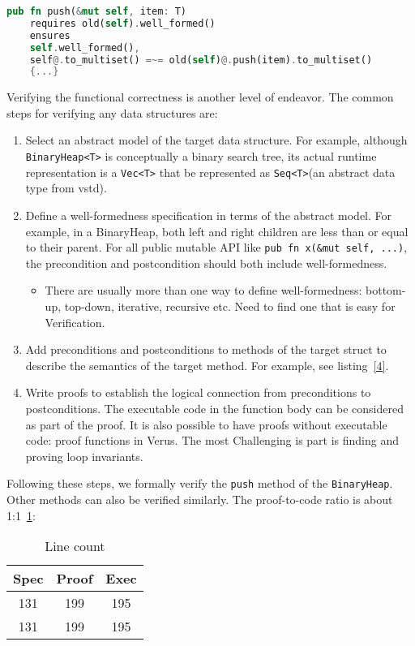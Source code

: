 \documentclass[conference]{IEEEtran}
\begin{document}
\begin{lstlisting}[float,language=Rust,style=colouredRust, caption={The specification of the \texttt{push} method of \texttt{BinaryHeap}.}, label = {4}]
    pub fn push(&mut self, item: T)
    requires old(self).well_formed()
    ensures 
    self.well_formed(),
    self@.to_multiset() =~= old(self)@.push(item).to_multiset()
    {...}
\end{lstlisting}
Verifying the functional correctness is another level of endeavor. The common steps for verifying any data structures are:
\begin{enumerate}
        \item Select an abstract model of the target data structure. For example, although \texttt{BinaryHeap<T>} is conceptually a binary search tree, its actual runtime representation is a \texttt{Vec<T>} that be represented as \texttt{Seq<T>}(an abstract data type from vstd).
   \item Define a well-formedness specification in terms of the abstract model. For example, in a BinaryHeap, both left and right children are less than or equal to their parent. For all public mutable API like \texttt{pub fn x(\&mut self, ...)}, the precondition and postcondition should both include well-formedness. 
   \begin{itemize}
        \item There are usually more than one way to define well-formedness: bottom-up, top-down, iterative, recursive etc. Need to find one that is easy for Verification.
   \end{itemize}
   \item Add preconditions and postconditions to methods of the target struct to describe the semantics of the target method. For example, see listing~\ref{4}.  
   \item Write proofs to establish the logical connection from preconditions to postconditions. The executable code in the function body can be considered as part of the proof. It is also possible to have proofs without executable code: proof functions in Verus. The most Challenging is part is finding and proving loop invariants.
\end{enumerate}

Following these steps, we formally verify the \texttt{push} method of the \texttt{BinaryHeap}. Other methods can also be verified similarly. The proof-to-code ratio is about 1:1~\ref{Line count}:

\begin{table}[h]
\centering
\begin{tabular}{|c|c|c|}
\hline
\textbf{Spec} & \textbf{Proof} & \textbf{Exec} \\
\hline
131 & 199 & 195 \\
\hline
131 & 199 & 195 \\
\hline
\end{tabular}
\caption{Line count}
\label{Line count}
\end{table}
\end{document}
